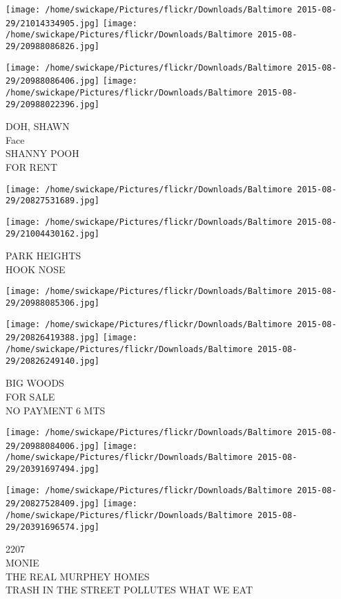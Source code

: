 \documentclass[10pt,letterpaper]{article}
\begin{document}
\texttt{[image: /home/swickape/Pictures/flickr/Downloads/Baltimore 2015-08-29/21014334905.jpg]}
\texttt{[image: /home/swickape/Pictures/flickr/Downloads/Baltimore 2015-08-29/20988086826.jpg]}

\texttt{[image: /home/swickape/Pictures/flickr/Downloads/Baltimore 2015-08-29/20988086406.jpg]}
\texttt{[image: /home/swickape/Pictures/flickr/Downloads/Baltimore 2015-08-29/20988022396.jpg]}

DOH, SHAWN\\
Face\\
SHANNY POOH\\
FOR RENT\\
\pagebreak

\texttt{[image: /home/swickape/Pictures/flickr/Downloads/Baltimore 2015-08-29/20827531689.jpg]}

\vspace{0.25in}
\texttt{[image: /home/swickape/Pictures/flickr/Downloads/Baltimore 2015-08-29/21004430162.jpg]}

PARK HEIGHTS\\
HOOK NOSE\\
\pagebreak

\texttt{[image: /home/swickape/Pictures/flickr/Downloads/Baltimore 2015-08-29/20988085306.jpg]}

\vspace{0.25in}
\texttt{[image: /home/swickape/Pictures/flickr/Downloads/Baltimore 2015-08-29/20826419388.jpg]}
\texttt{[image: /home/swickape/Pictures/flickr/Downloads/Baltimore 2015-08-29/20826249140.jpg]}

BIG WOODS\\
FOR SALE\\
NO PAYMENT 6 MTS\\
\pagebreak

\texttt{[image: /home/swickape/Pictures/flickr/Downloads/Baltimore 2015-08-29/20988084006.jpg]}
\texttt{[image: /home/swickape/Pictures/flickr/Downloads/Baltimore 2015-08-29/20391697494.jpg]}

\texttt{[image: /home/swickape/Pictures/flickr/Downloads/Baltimore 2015-08-29/20827528409.jpg]}
\texttt{[image: /home/swickape/Pictures/flickr/Downloads/Baltimore 2015-08-29/20391696574.jpg]}

2207\\
MONIE\\
THE REAL MURPHEY HOMES\\
TRASH IN THE STREET POLLUTES WHAT WE EAT\\
\pagebreak
\end{document}
